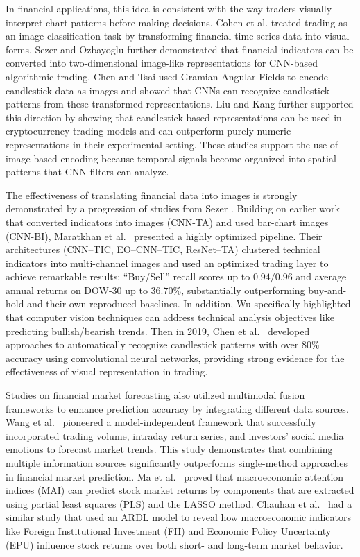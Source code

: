 In financial applications, this idea is consistent with the way traders visually interpret chart patterns before making decisions. 
Cohen et al. \cite{cohen2020trading} treated trading as an image classification task by transforming financial time-series data into visual forms. 
Sezer and Ozbayoglu \cite{sezer2018algorithmic} further demonstrated that financial indicators can be converted into two-dimensional image-like representations for CNN-based algorithmic trading. 
Chen and Tsai \cite{chen2020encoding} used Gramian Angular Fields to encode candlestick data as images and showed that CNNs can recognize candlestick patterns from these transformed representations. 
Liu and Kang \cite{liu2023automated} further supported this direction by showing that candlestick-based representations can be used in cryptocurrency trading models and can outperform purely numeric representations in their experimental setting.
These studies support the use of image-based encoding because temporal signals become organized into spatial patterns that CNN filters can analyze.

The effectiveness of translating financial data into images is strongly demonstrated by a progression of studies from Sezer \cite{sezer2018algorithmic}. Building on earlier work that converted indicators into images (CNN-TA) and used bar-chart images (CNN-BI), Maratkhan et al.\ \cite{maratkhan2021deep} presented a highly optimized pipeline. Their architectures (CNN--TIC, EO--CNN--TIC, ResNet--TA) clustered technical indicators into multi-channel images and used an optimized trading layer to achieve remarkable results: ``Buy/Sell'' recall scores up to $0.94/0.96$ and average annual returns on DOW-30 up to $36.70\%$, substantially outperforming buy-and-hold and their own reproduced baselines. In addition, Wu \cite{wu2021empowering} specifically highlighted that computer vision techniques can address technical analysis objectives like predicting bullish/bearish trends. Then in 2019, Chen et al.\ \cite{chen2020encoding} developed approaches to automatically recognize candlestick patterns with over $80\%$ accuracy using convolutional neural networks, providing strong evidence for the effectiveness of visual representation in trading.

Studies on financial market forecasting also utilized multimodal fusion frameworks to enhance prediction accuracy by integrating different data sources. Wang et al.\ \cite{wang2019aggregating} pioneered a model-independent framework that successfully incorporated trading volume, intraday return series, and investors’ social media emotions to forecast market trends. This study demonstrates that combining multiple information sources significantly outperforms single-method approaches in financial market prediction. Ma et al.\ \cite{ma2022macroeconomic} proved that macroeconomic attention indices (MAI) can predict stock market returns by components that are extracted using partial least squares (PLS) and the LASSO method. Chauhan et al.\ \cite{chauhan2025exploring} had a similar study that used an ARDL model to reveal how macroeconomic indicators like Foreign Institutional Investment (FII) and Economic Policy Uncertainty (EPU) influence stock returns over both short- and long-term market behavior.

